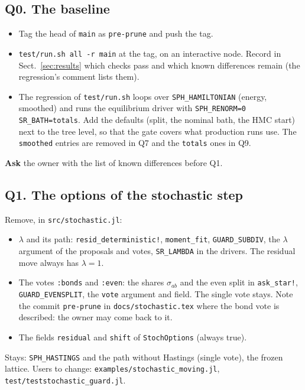 \documentclass[11pt,aps,preprint,nofootinbib,superscriptaddress,tightenlines]{revtex4-2}
\def\Sect#1{Sect.~\ref{#1}}
\newcommand{\ask}{\textbf{Ask}}
\begin{document}
\subsection*{Q0. The baseline}
\begin{itemize}
\item Tag the head of \texttt{main} as \texttt{pre-prune} and push the tag.
\item \texttt{test/run.sh all -r main} at the tag, on an interactive node.  Record in \Sect{sec:results} which checks pass and which known
  differences remain (the regression's comment lists them).
\item The regression of \nolinkurl{test/run.sh} loops over \texttt{SPH\_HAMILTONIAN} (energy, smoothed) and runs the equilibrium driver with
  \texttt{SPH\_RENORM=0 SR\_BATH=totals}.  Add the defaults (split, the nominal bath, the HMC start) next to the tree level, so that the gate
  covers what production runs use.  The \texttt{smoothed} entries are removed in Q7 and the \texttt{totals} ones in Q9.
\end{itemize}
\ask{} the owner with the list of known differences before Q1.

\subsection*{Q1. The options of the stochastic step}
Remove, in \nolinkurl{src/stochastic.jl}:
\begin{itemize}
\item $\lambda$ and its path: \texttt{resid\_deterministic!}, \texttt{moment\_fit}, \texttt{GUARD\_SUBDIV}, the $\lambda$ argument of the
  proposals and votes, \texttt{SR\_LAMBDA} in the drivers.  The residual move always has $\lambda=1$.
\item The votes \texttt{:bonds} and \texttt{:even}: the shares $\sigma_{ab}$ and the even split in \texttt{ask\_star!},
  \texttt{GUARD\_EVENSPLIT}, the \texttt{vote} argument and field.  The single vote stays.  Note the commit \texttt{pre-prune} in
  \nolinkurl{docs/stochastic.tex} where the bond vote is described: the owner may come back to it.
\item The fields \texttt{residual} and \texttt{shift} of \texttt{StochOptions} (always true).
\end{itemize}
Stays: \texttt{SPH\_HASTINGS} and the path without Hastings (single vote), the frozen lattice.  Users to change:
\nolinkurl{examples/stochastic_moving.jl}, \nolinkurl{test/teststochastic_guard.jl}.
\end{document}
